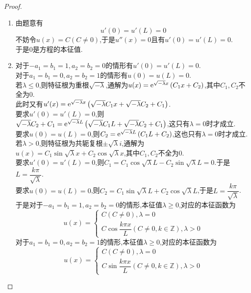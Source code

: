 \documentclass{ctexart}
\begin{document}
\begin{proof}
    \begin{enumerate}[label=\tbf{(\arabic*)}]
        \item 由题意有
            \[u'(0)=u'(L)=0\]
            不妨令$u(x)=C(C\neq0)$,于是$u''(x)=0$且有$u'(0)=u'(L)=0$.\\
            于是$0$是方程的本征值.
        \item 对于$-a_1=b_1=1,a_2=b_2=0$的情形有$u'(0)=u'(L)=0$.\\
            对于$a_1=b_1=0,a_2=b_2=1$的情形有$u(0)=u(L)=0$.\\
            若$\lambda\leqslant0$,则特征根为重根$\sqrt{-\lambda}$,通解为$u(x)=\mathrm{e}^{\sqrt{-\lambda} x}\left(C_1x+C_2\right)$,其中$C_1,C_2$不全为$0$.\\
            此时又有$u'(x)=\mathrm{e}^{\sqrt{-\lambda} x}\left(\sqrt{-\lambda} C_1x+\sqrt{-\lambda} C_2+C_1\right)$.\\
            要求$u'(0)=u'(L)=0$,则$\sqrt{-\lambda} C_2+C_1=\mathrm{e}^{\sqrt{-\lambda} L}\left(\sqrt{-\lambda} C_1L+\sqrt{-\lambda} C_2+C_1\right)$,这只有$\lambda=0$时才成立.\\
            要求$u(0)=u(L)=0$,则$C_2=\mathrm{e}^{\sqrt{-\lambda} L}\left(C_1 L+C_2\right)$,这也只有$\lambda=0$时才成立.\\
            若$\lambda>0$,则特征根为共轭复根$\pm\sqrt{\lambda}i$,通解为$u(x)=C_1\sin\sqrt{\lambda}x+C_2\cos\sqrt{\lambda}x$,其中$C_1,C_2$不全为$0$.\\
            要求$u'(0)=u'(L)=0$,则$C_1=C_1\cos\sqrt{\lambda}L-C_2\sin\sqrt{\lambda}L=0$.于是$L=\dfrac{k\pi}{\sqrt{\lambda}}$.\\
            要求$u(0)=u(L)=0$,则$C_2=C_1\sin\sqrt\lambda L+C_2\cos\sqrt\lambda L$,于是$L=\dfrac{k\pi}{\sqrt\lambda}$.\\
            于是对于$-a_1=b_1=1,a_2=b_2=0$的情形,本征值$\lambda\geqslant0$,对应的本征函数为
            \[u(x)=\left\{\begin{array}{l}
                C(C\neq0),\lambda=0\\
                C\cos\dfrac{k\pi x}{L}(C\neq0,k\in\mathbb{Z}),\lambda>0
            \end{array}\right.\]
            对于$a_1=b_1=0,a_2=b_2=1$的情形,本征值$\lambda\geqslant0$,对应的本征函数为
            \[u(x)=\left\{\begin{array}{l}
                C(C\neq0),\lambda=0\\
                C\sin\dfrac{k\pi x}{L}(C\neq0,k\in\mathbb{Z}),\lambda>0
            \end{array}\right.\]

\end{enumerate}
\end{proof}
\end{document}
